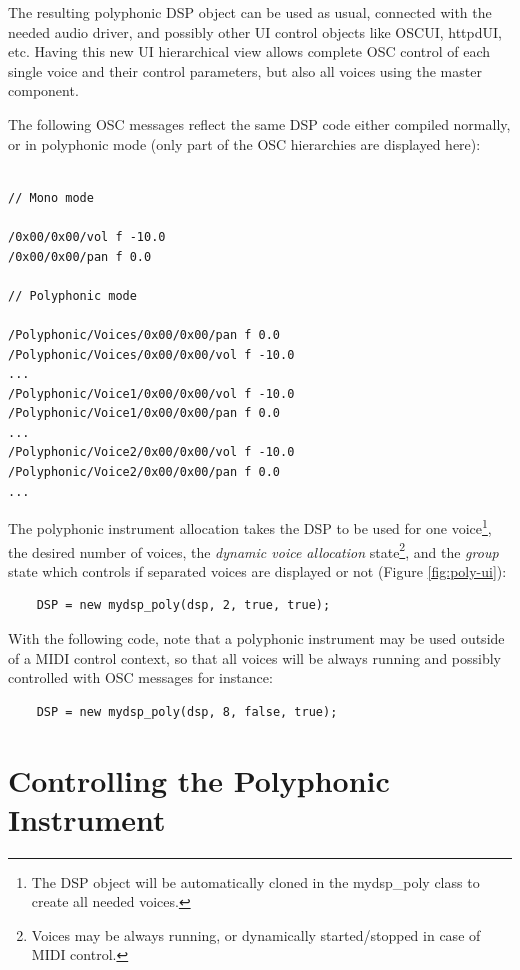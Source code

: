 The resulting polyphonic DSP object can be used as usual, connected with the needed audio driver, and possibly other UI control objects like OSCUI, httpdUI, etc. Having this new UI hierarchical view allows complete OSC control of each single voice and their control parameters, but also all voices using the master component. 

The following OSC messages reflect the same DSP code either compiled normally,  or in polyphonic mode (only part of the OSC hierarchies are displayed here):

\footnotesize
\begin{lstlisting}

// Mono mode

/0x00/0x00/vol f -10.0
/0x00/0x00/pan f 0.0

// Polyphonic mode

/Polyphonic/Voices/0x00/0x00/pan f 0.0
/Polyphonic/Voices/0x00/0x00/vol f -10.0
...
/Polyphonic/Voice1/0x00/0x00/vol f -10.0
/Polyphonic/Voice1/0x00/0x00/pan f 0.0
...
/Polyphonic/Voice2/0x00/0x00/vol f -10.0
/Polyphonic/Voice2/0x00/0x00/pan f 0.0
...
\end{lstlisting}
\normalsize

The polyphonic instrument allocation takes the DSP to be used for one voice\footnote{The DSP object will be automatically cloned in the mydsp\_poly class to create all needed voices.},  the desired number of voices, the {\it dynamic voice allocation} state\footnote{Voices may be always running, or dynamically started/stopped in case of MIDI control.},  and the {\it group} state which controls if separated voices are displayed or not (Figure \ref{fig:poly-ui}): 

\footnotesize
\begin{lstlisting}
    DSP = new mydsp_poly(dsp, 2, true, true);  
\end{lstlisting}
    
\normalsize
With the following code, note that a polyphonic instrument may be used outside of a MIDI control context, so that all voices will be always running and possibly controlled with OSC messages for instance:

\footnotesize
\begin{lstlisting}
    DSP = new mydsp_poly(dsp, 8, false, true);
\end{lstlisting}

\normalsize
    
\section{Controlling the Polyphonic Instrument}

